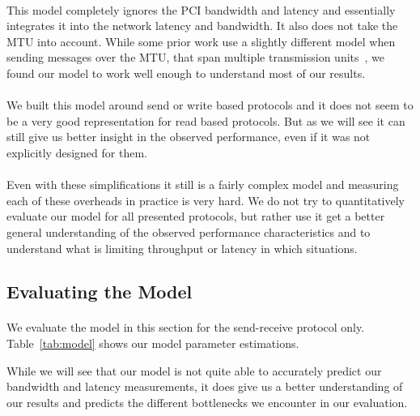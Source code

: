 \paragraph{} This model completely ignores the PCI bandwidth and latency and essentially integrates it into the network latency
and bandwidth. It also does not take the MTU into account. While some prior work use a slightly different model when sending 
messages over the MTU, that span multiple transmission units~\cite{dare}, we found our model to work well enough to understand
most of our results.

\paragraph{} We built this model around send or write based protocols and it does not seem to be a very good representation 
for read based protocols. But as we will see it can still give us better insight in the observed performance, even if 
it was not explicitly designed for them.

\paragraph{} Even with these simplifications it still is a fairly complex model and measuring each of these overheads in 
practice is very hard. We do not try to quantitatively evaluate our model for all presented protocols, but rather use it 
get a better general understanding of the observed performance characteristics and to understand what is limiting throughput
or latency in which situations.

\subsection{Evaluating the Model}

\paragraph{} We evaluate the model in this section for the send-receive protocol only. Table~\ref{tab:model} shows our model
parameter estimations.

While we will see that our model is not quite able to accurately predict our bandwidth and latency measurements, it does 
give us a better understanding of our results and predicts the different bottlenecks we encounter in our evaluation.

